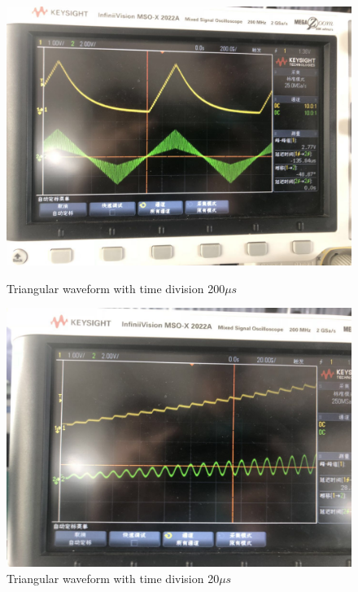 \documentclass[12pt]{article}
\begin{document}
\begin{figure}[H]
\centering
\includegraphics[scale=0.25]{P18.jpg}
\caption{Triangular waveform with time division 200$\mu s$}
\includegraphics[scale=0.25]{P19.jpg}
\caption{Triangular waveform with time division 20$\mu s$}
\end{figure}
\end{document}
